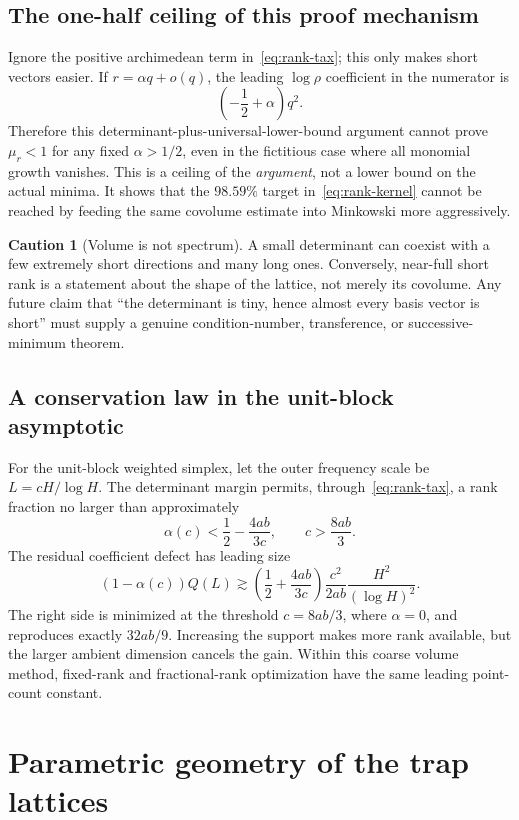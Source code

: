 \documentclass[11pt,oneside]{article}
\theoremstyle{definition}
\newtheorem{warning}[theorem]{Caution}
\theoremstyle{remark}
\begin{document}
\subsection{The one-half ceiling of this proof mechanism}

Ignore the positive archimedean term in~\eqref{eq:rank-tax}; this only makes short vectors
easier.  If $r=\alpha q+o(q)$, the leading $\log\rho$ coefficient in the numerator is
\[
 \left(-\frac12+\alpha\right)q^2.
\]
Therefore this determinant-plus-universal-lower-bound argument cannot prove
$\mu_r<1$ for any fixed $\alpha>1/2$, even in the fictitious case where all monomial growth
vanishes.  This is a ceiling of the \emph{argument}, not a lower bound on the actual minima.
It shows that the $98.59\%$ target in~\eqref{eq:rank-kernel} cannot be reached by feeding the
same covolume estimate into Minkowski more aggressively.

\begin{warning}[Volume is not spectrum]
A small determinant can coexist with a few extremely short directions and many long ones.
Conversely, near-full short rank is a statement about the shape of the lattice, not merely its
covolume.  Any future claim that ``the determinant is tiny, hence almost every basis vector is
short'' must supply a genuine condition-number, transference, or successive-minimum theorem.
\end{warning}

\subsection{A conservation law in the unit-block asymptotic}

For the unit-block weighted simplex, let the outer frequency scale be
$L=cH/\log H$.  The determinant margin permits, through~\eqref{eq:rank-tax}, a rank fraction no
larger than approximately
\[
 \alpha(c)<\frac12-\frac{4ab}{3c},
 \qquad c>\frac{8ab}{3}.
\]
The residual coefficient defect has leading size
\[
 (1-\alpha(c))Q(L)
 \gtrsim
 \left(\frac12+\frac{4ab}{3c}\right)
 \frac{c^2}{2ab}\frac{H^2}{(\log H)^2}.
\]
The right side is minimized at the threshold $c=8ab/3$, where $\alpha=0$, and reproduces
exactly $32ab/9$.  Increasing the support makes more rank available, but the larger ambient
dimension cancels the gain.  Within this coarse volume method, fixed-rank and fractional-rank
optimization have the same leading point-count constant.

\section{Parametric geometry of the trap lattices}
\label{sec:pgn}
\end{document}
